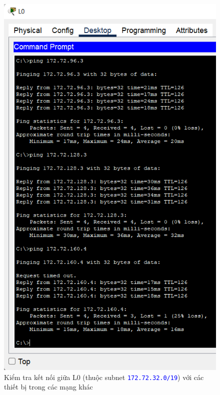 \begin{enumerate}
\begin{enumerate}
\begin{figure}[H]
\begin{center}
\includegraphics[scale=.5]{../figures/p2/test-ping-4}
\end{center}
\caption{Kiểm tra kết nối giữa L0 (thuộc subnet \texttt{\textcolor{blue}{172.72.32.0/19}}) với các thiết bị trong các mạng khác}
\end{figure}


\end{enumerate}
\end{enumerate}
